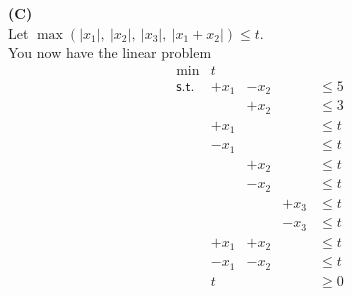 \documentclass[11pt]{article}
\begin{document}
\medskip

\noindent\textbf{(C)}
\\
Let $\max( | x_1 | ,\ |x_2| ,\ |x_3|,\ |x_1+
  x_2 |) \leq t$. \\
You now have the linear problem
\[\begin{array}{rllllll}
\min & t \\
\mathsf{s.t.} 
& +x_1 & -x_2 & & \leq 5 \\
& & +x_2 & & \leq 3 \\
& +x_1 & & & \leq t \\
& -x_1 & & & \leq t \\
& & +x_2 & & \leq t \\
& & -x_2 & & \leq t \\
& & & +x_3 & \leq t \\
& & & -x_3 & \leq t \\
& +x_1 & +x_2 & & \leq t \\
& -x_1 & -x_2 & & \leq t \\
& t & & & \geq 0 \\
\end{array}\]
\end{document}

